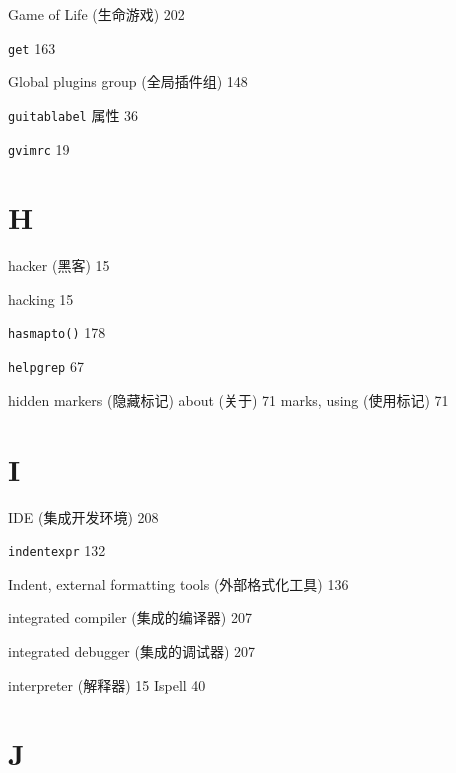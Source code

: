 Game of Life (生命游戏) 202

\texttt{get} 163

Global plugins group (全局插件组) 148

\texttt{guitablabel} 属性 36

\texttt{gvimrc} 19

\section{H}

hacker (黑客) 15

hacking 15

\texttt{hasmapto()} 178

\texttt{helpgrep} 67

hidden markers (隐藏标记)
  about (关于) 71
  marks, using (使用标记) 71

\section{I}

IDE (集成开发环境) 208

\texttt{indentexpr} 132

Indent, external formatting tools (外部格式化工具) 136

integrated compiler (集成的编译器) 207

integrated debugger (集成的调试器) 207

interpreter (解释器) 15
Ispell 40

\section{J}


